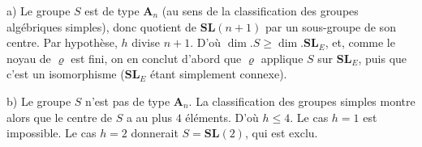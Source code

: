a) Le groupe $S$ est de type $\mathbf{A}_n$ (au sens de la classification des groupes algébriques simples), donc quotient de $\mathbf{SL}(n+1)$ par un sous-groupe de son centre. Par hypothèse, $h$ divise $n+1$. D’où $\dim. S\geqslant\dim.\mathbf{SL}_E$, et, comme le noyau de $\varrho$ est fini, on en conclut d’abord que $\varrho$ applique $S$ sur $\mathbf{SL}_E$, puis que c’est un isomorphisme ($\mathbf{SL}_E$ étant simplement connexe).

b) Le groupe $S$ n’est pas de type $\mathbf{A}_n$. La classification des groupes simples montre alors que le centre de $S$ a au plus $4$ éléments. D’où $h\leqslant 4$. Le cas $h=1$ est impossible. Le cas $h=2$ donnerait $S=\mathbf{SL}(2)$, qui est exclu.
